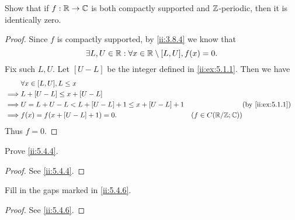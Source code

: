 \exercisesection

\begin{ex}\label{ii:ex:5.4.1}
  Show that if \(f : \mathbb{R} \to \mathbb{C}\) is both compactly supported and \(\mathbb{Z}\)-periodic, then it is identically zero.
\end{ex}

\begin{proof}
  Since \(f\) is compactly supported, by \cref{ii:3.8.4} we know that
  \[
    \exists L, U \in \mathbb{R} : \forall x \in \mathbb{R} \setminus [L, U], f(x) = 0.
  \]
  Fix such \(L, U\).
  Let \([U - L]\) be the integer defined in \cref{ii:ex:5.1.1}.
  Then we have
  \begin{align*}
             & \forall x \in [L, U], L \leq x                                                                    \\
    \implies & L + [U - L] \leq x + [U - L]                                                                      \\
    \implies & U = L + U - L < L + [U - L] + 1 \leq x + [U - L] + 1 &                         & \by{ii:ex:5.1.1} \\
    \implies & f(x) = f(x + [U - L] + 1) = 0.                       & (f \in C(\R / \Z ; \C))
  \end{align*}
  Thus \(f = 0\).
\end{proof}

\begin{ex}\label{ii:ex:5.4.2}
  Prove \cref{ii:5.4.4}.
\end{ex}

\begin{proof}
  See \cref{ii:5.4.4}.
\end{proof}

\begin{ex}\label{ii:ex:5.4.3}
  Fill in the gaps marked in \cref{ii:5.4.6}.
\end{ex}

\begin{proof}
  See \cref{ii:5.4.6}.
\end{proof}
